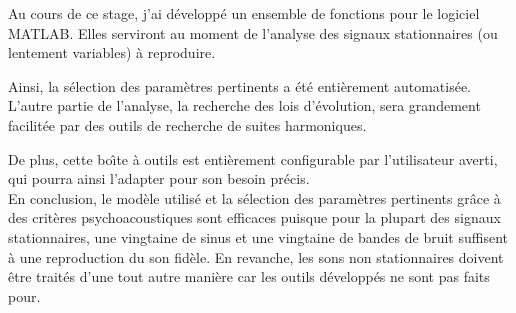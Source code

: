 \documentclass[12pt,a4paper,french]{article}
\begin{document}
Au cours de ce stage, j'ai d{\'e}velopp{\'e} un ensemble de fonctions pour
le logiciel MATLAB. Elles serviront au moment de l'analyse des
signaux stationnaires (ou lentement variables) {\`a} reproduire.

Ainsi, la s{\'e}lection des param{\`e}tres pertinents a {\'e}t{\'e} enti{\`e}rement
automatis{\'e}e. L'autre partie de l'analyse, la recherche des lois
d'{\'e}volution, sera grandement facilit{\'e}e par des outils de recherche
de suites harmoniques.

De plus, cette bo{\^\i}te {\`a} outils est enti{\`e}rement configurable par
l'utilisateur averti, qui pourra ainsi l'adapter pour son besoin
pr{\'e}cis.\\

En conclusion, le mod{\`e}le utilis{\'e} et la s{\'e}lection des param{\`e}tres
pertinents gr{\^a}ce {\`a} des crit{\`e}res psychoacoustiques sont efficaces
puisque pour la plupart des signaux stationnaires, une vingtaine
de sinus et une vingtaine de bandes de bruit suffisent {\`a} une
reproduction du son fid{\`e}le. En revanche, les sons non
stationnaires doivent {\^e}tre trait{\'e}s d'une tout autre mani{\`e}re car
les outils d{\'e}velopp{\'e}s ne sont pas faits pour.
\end{document}
